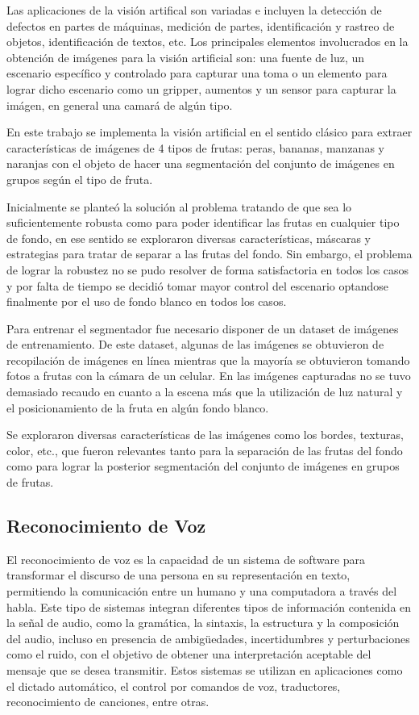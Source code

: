 \documentclass[a4paper, 12pt]{article}
\begin{document}
Las aplicaciones de la visión artifical son variadas e incluyen la detección de defectos en partes de máquinas, medición de partes, identificación y rastreo de objetos, identificación de textos, etc.
Los principales elementos involucrados en la obtención de imágenes para la visión artificial son: una fuente de luz, un escenario específico y controlado para capturar una toma o un elemento para lograr dicho escenario como un gripper, aumentos y un sensor para capturar la imágen, en general una camará de algún tipo.

En este trabajo se implementa la visión artificial en el sentido clásico para extraer características de imágenes de 4 tipos de frutas: peras, bananas, manzanas y naranjas con el objeto de hacer una segmentación del conjunto de imágenes en grupos según el tipo de fruta.

Inicialmente se planteó la solución al problema tratando de que sea lo suficientemente robusta como para poder identificar las frutas en cualquier tipo de fondo, en ese sentido se exploraron diversas características, máscaras y estrategias para tratar de separar a las frutas del fondo. Sin embargo, el problema de lograr la robustez no se pudo resolver de forma satisfactoria en todos los casos y por falta de tiempo se decidió tomar mayor control del escenario optandose finalmente por el uso de fondo blanco en todos los casos.

Para entrenar el segmentador fue necesario disponer de un dataset de imágenes de entrenamiento. De este dataset, algunas de las imágenes se obtuvieron de recopilación de imágenes en línea mientras que la mayoría se obtuvieron tomando fotos a frutas con la cámara de un celular. En las imágenes capturadas no se tuvo demasiado recaudo en cuanto a la escena más que la utilización de luz natural y el posicionamiento de la fruta en algún fondo blanco.

Se exploraron diversas características de las imágenes como los bordes, texturas, color, etc., que fueron relevantes tanto para la separación de las frutas del fondo como para lograr la posterior segmentación del conjunto de imágenes en grupos de frutas.
\subsection{Reconocimiento de Voz}

El reconocimiento de voz es la capacidad de un sistema de software para transformar el discurso de una persona en su representación en texto, permitiendo la comunicación entre un humano y una computadora a través del habla. Este tipo de sistemas integran diferentes tipos de información contenida en la señal de audio, como la gramática, la sintaxis, la estructura y la composición del audio, incluso en presencia de ambigüedades, incertidumbres y perturbaciones como el ruido, con el objetivo de obtener una interpretación aceptable del mensaje que se desea transmitir. Estos sistemas se utilizan en aplicaciones como el dictado automático, el control por comandos de voz, traductores, reconocimiento de canciones, entre otras.
\end{document}
